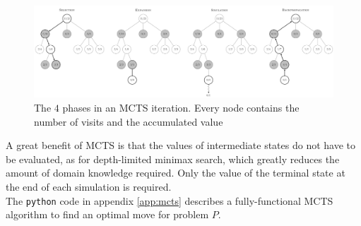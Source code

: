 \documentclass[a4paper,10pt]{article}
\begin{document}
\begin{figure}[h]
\includegraphics[scale=0.25]{MCTS-steps.png}
\caption{The $4$ phases in an MCTS iteration. Every node contains the number of visits and the accumulated value}
\end{figure}

A great benefit of MCTS is that the values of intermediate states do not have to be evaluated, as for depth-limited minimax search, which greatly reduces the amount of domain knowledge required. Only the value of the terminal state at the end of each simulation is required.\\
The {\tt python} code in appendix \ref{app:mcts} describes a fully-functional MCTS algorithm to find an optimal move for problem $P$.



\end{document}
